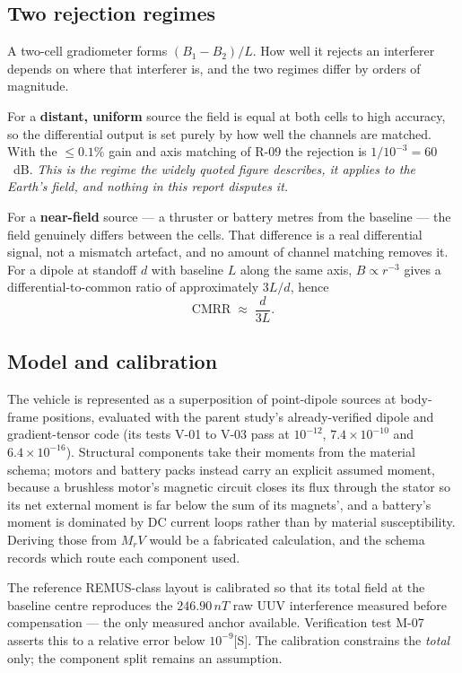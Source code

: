 \documentclass[11pt]{article}
\newcommand{\nT}{\,nT}\newcommand{\pT}{\,pT}\newcommand{\fT}{\,fT}
\newcommand{\sig}{\textcolor{violet!70!black}{\footnotesize[S]}}
\begin{document}
\subsection{Two rejection regimes}
A two-cell gradiometer forms $(B_1-B_2)/L$. How well it rejects an interferer
depends on where that interferer is, and the two regimes differ by orders of
magnitude.

For a \textbf{distant, uniform} source the field is equal at both cells to high
accuracy, so the differential output is set purely by how well the channels are
matched. With the $\leq0.1\%$ gain and axis matching of R-09 the rejection is
$1/10^{-3}=60$~dB. \emph{This is the regime the widely quoted figure describes,
it applies to the Earth's field, and nothing in this report disputes it.}

For a \textbf{near-field} source --- a thruster or battery metres from the
baseline --- the field genuinely differs between the cells. That difference is a
real differential signal, not a mismatch artefact, and no amount of channel
matching removes it. For a dipole at standoff $d$ with baseline $L$ along the
same axis, $B\propto r^{-3}$ gives a differential-to-common ratio of
approximately $3L/d$, hence
\begin{equation}
\mathrm{CMRR}\;\approx\;\frac{d}{3L} .
\label{eq:cmrr}
\end{equation}

\subsection{Model and calibration}
The vehicle is represented as a superposition of point-dipole sources at
body-frame positions, evaluated with the parent study's already-verified dipole
and gradient-tensor code (its tests V-01 to V-03 pass at $10^{-12}$,
$7.4\times10^{-10}$ and $6.4\times10^{-16}$). Structural components take their
moments from the material schema; motors and battery packs instead carry an
explicit assumed moment, because a brushless motor's magnetic circuit closes its
flux through the stator so its net external moment is far below the sum of its
magnets', and a battery's moment is dominated by DC current loops rather than by
material susceptibility. Deriving those from $M_r V$ would be a fabricated
calculation, and the schema records which route each component used.

The reference REMUS-class layout is calibrated so that its total field at the
baseline centre reproduces the $246.90\nT$ raw UUV interference measured before
compensation \cite{oehler2024} --- the only measured anchor available.
Verification test M-07 asserts this to a relative error below $10^{-9}$\sig. The
calibration constrains the \emph{total} only; the component split remains an
assumption.
\end{document}
